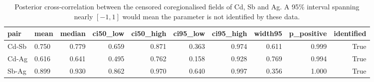 \begin{table}[htbp]
\centering
\caption{Posterior cross-correlation between the censored coregionalised fields of Cd, Sb and Ag. A 95\% interval spanning nearly $[-1,1]$ would mean the parameter is not identified by these data.}
\label{tab:lmc}
\footnotesize
\begin{tabular}{llrrrrrrrr}
\toprule
pair & mean & median & ci50\_low & ci50\_high & ci95\_low & ci95\_high & width95 & p\_positive & identified \\
\midrule
Cd-Sb & 0.750 & 0.779 & 0.659 & 0.871 & 0.363 & 0.974 & 0.611 & 0.999 & True \\
Cd-Ag & 0.616 & 0.641 & 0.495 & 0.762 & 0.158 & 0.928 & 0.769 & 0.994 & True \\
Sb-Ag & 0.899 & 0.930 & 0.862 & 0.970 & 0.640 & 0.997 & 0.356 & 1.000 & True \\
\bottomrule
\end{tabular}
\end{table}
